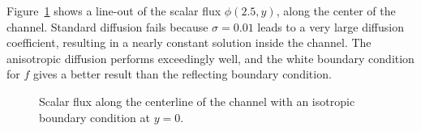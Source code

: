 \documentclass{anstrans}
\begin{document}
Figure~\ref{fig:isotropic} shows a line-out of the scalar flux $\phi(2.5,y)$,
along the center
of the channel. Standard diffusion fails because $\sigma=0.01$ leads to a very
large diffusion coefficient, resulting in a nearly constant solution inside the
channel. The anisotropic diffusion performs exceedingly well, and the
white boundary condition for $f$ gives a better result than the reflecting
boundary condition.

\begin{figure}[htb!]
  \centering
  \hspace{-.5in}
  
  \hspace{-.5in}
  \caption{Scalar flux along the centerline of the channel with an isotropic
  boundary condition at $y=0$.}
  \label{fig:isotropic}
\end{figure}


%  

\end{document}
